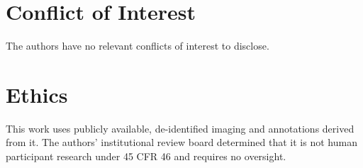\documentclass[aapm,mph,amsmath,amssymb,preprint,linenumbers]{revtex4-2}
\begin{document}
\section*{Conflict of Interest}
The authors have no relevant conflicts of interest to disclose.

\section*{Ethics}
This work uses publicly available, de-identified imaging and annotations derived from it.
The authors' institutional review board determined that it is not human participant
research under 45 CFR 46 and requires no oversight.
\end{document}
